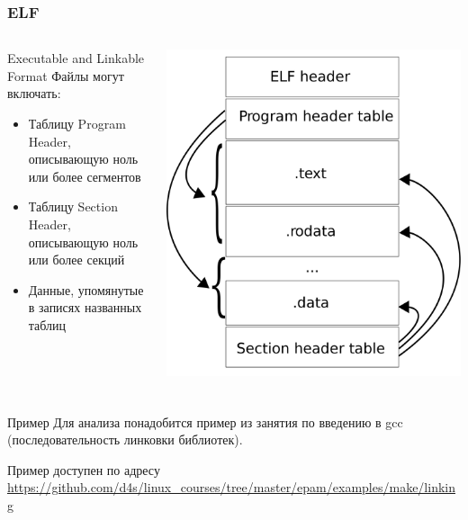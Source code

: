 
\begin{frame}
	\frametitle{ELF}
	\begin{columns}
			\begin{block}{Executable and Linkable Format}
				Файлы могут включать:
				\begin{itemize}
					\item Таблицу Program Header,  описывающую ноль или более сегментов
					\item Таблицу Section Header,  описывающую ноль или более секций
					\item Данные,  упомянутые в записях названных таблиц
				\end{itemize}
			\end{block}
			\includegraphics[height=0.8\textheight]{../../slides/elf-analysis/Elf-layout.png}
	\end{columns}
\end{frame}

\begin{frame}
	\frametitle{}

	\begin{block}{Пример}
		Для анализа понадобится пример из занятия по введению в gcc (последовательность линковки библиотек).
	\end{block}

	Пример доступен по адресу \url{https://github.com/d4s/linux\_courses/tree/master/epam/examples/make/linking}
	
\end{frame}


